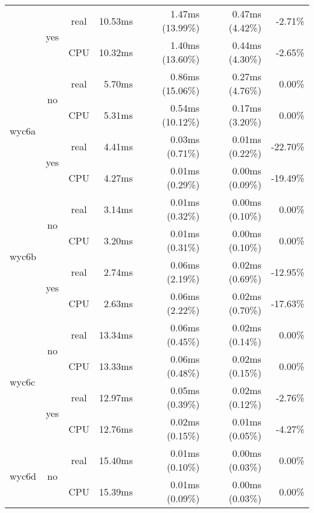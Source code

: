 \documentclass[en]{pracamgr}
\begin{document}
\begin{small}
\begin{longtable}{|l|c|c|r|r|r|r|}
                          \cline{2-7}
                          & \multirow{2}{*}{yes} & real & 10.53ms & 1.47ms (13.99\%) & 0.47ms (4.42\%) & -2.71\% \\*
                          &                      & CPU  & 10.32ms & 1.40ms (13.60\%) & 0.44ms (4.30\%) & -2.65\% \\
\hline
\multirow{4}{*}{wyc6a}    & \multirow{2}{*}{no}  & real & 5.70ms & 0.86ms (15.06\%) & 0.27ms (4.76\%) & 0.00\% \\*
                          &                      & CPU  & 5.31ms & 0.54ms (10.12\%) & 0.17ms (3.20\%) & 0.00\% \\*
                          \cline{2-7}
                          & \multirow{2}{*}{yes} & real & 4.41ms & 0.03ms (0.71\%) & 0.01ms (0.22\%) & -22.70\% \\*
                          &                      & CPU  & 4.27ms & 0.01ms (0.29\%) & 0.00ms (0.09\%) & -19.49\% \\
\hline
\multirow{4}{*}{wyc6b}    & \multirow{2}{*}{no}  & real & 3.14ms & 0.01ms (0.32\%) & 0.00ms (0.10\%) & 0.00\% \\*
                          &                      & CPU  & 3.20ms & 0.01ms (0.31\%) & 0.00ms (0.10\%) & 0.00\% \\*
                          \cline{2-7}
                          & \multirow{2}{*}{yes} & real & 2.74ms & 0.06ms (2.19\%) & 0.02ms (0.69\%) & -12.95\% \\*
                          &                      & CPU  & 2.63ms & 0.06ms (2.22\%) & 0.02ms (0.70\%) & -17.63\% \\
\hline
\multirow{4}{*}{wyc6c}    & \multirow{2}{*}{no}  & real & 13.34ms & 0.06ms (0.45\%) & 0.02ms (0.14\%) & 0.00\% \\*
                          &                      & CPU  & 13.33ms & 0.06ms (0.48\%) & 0.02ms (0.15\%) & 0.00\% \\*
                          \cline{2-7}
                          & \multirow{2}{*}{yes} & real & 12.97ms & 0.05ms (0.39\%) & 0.02ms (0.12\%) & -2.76\% \\*
                          &                      & CPU  & 12.76ms & 0.02ms (0.15\%) & 0.01ms (0.05\%) & -4.27\% \\
\hline
\multirow{4}{*}{wyc6d}    & \multirow{2}{*}{no}  & real & 15.40ms & 0.01ms (0.10\%) & 0.00ms (0.03\%) & 0.00\% \\*
                          &                      & CPU  & 15.39ms & 0.01ms (0.09\%) & 0.00ms (0.03\%) & 0.00\% \\*

\end{longtable}
\end{small}
\end{document}
